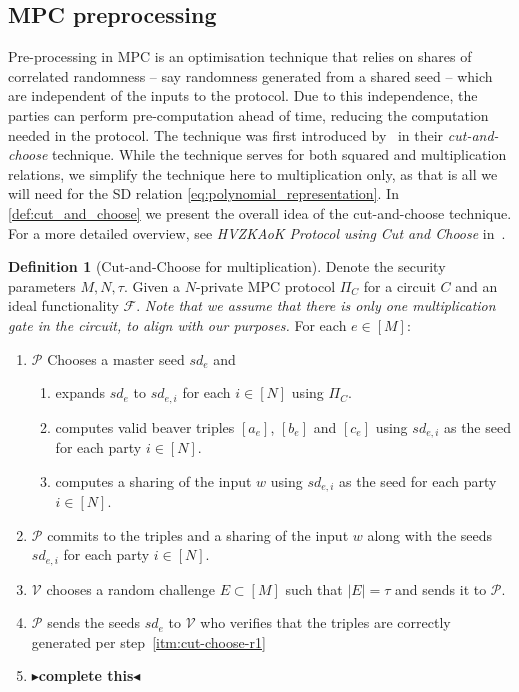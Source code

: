 \documentclass[twoside,11pt]{report}
\theoremstyle{definition}
\newtheorem{definition}{Definition}[section]
\theoremstyle{plain}
\newcommand{\todo}[1]{{\color[rgb]{.5,0,0}\textbf{$\blacktriangleright$#1$\blacktriangleleft$}}}
\begin{document}
\subsection{MPC preprocessing}

Pre-processing in MPC is an optimisation technique that relies on shares of correlated randomness -- say randomness generated from a shared seed -- which are independent of the inputs to the protocol. Due to this independence, the parties can perform pre-computation ahead of time, reducing the computation needed in the protocol. The technique was first introduced by~\cite{katz2018improved} in their \textit{cut-and-choose} technique. While the technique serves for both squared and multiplication relations, we simplify the technique here to multiplication only, as that is all we will need for the SD relation \autoref{eq:polynomial_representation}. In \autoref{def:cut_and_choose} we present the overall idea of the cut-and-choose technique. For a more detailed overview, see \textit{HVZKAoK Protocol using Cut and Choose} in~\cite{baum2020concretely}.

\begin{definition}[Cut-and-Choose for multiplication]\label{def:cut_and_choose}
  Denote the security parameters $M, N, \tau$. Given a $N$-private MPC protocol $\Pi_C$ for a circuit $C$ and an ideal functionality $\mathcal{F}$. \textit{Note that we assume that there is only one multiplication gate in the circuit, to align with our purposes.}
  For each $e \in [M]$:
  \begin{enumerate}[itemsep=0pt, parsep=0pt]
    \item\label{itm:cut-choose-r1} $\mathcal{P}$ Chooses a master seed $sd_e$ and
          \begin{enumerate}[nolistsep]
            \item expands $sd_e$ to $sd_{e,i}$ for each $i \in [N]$ using $\Pi_C$.
            \item computes valid beaver triples $[a_{e}]$, $[b_{e}]$ and $[c_{e}]$ using $sd_{e,i}$ as the seed for each party $i \in [N]$.
            \item computes a sharing of the input $w$ using $sd_{e,i}$ as the seed for each party $i \in [N]$.
          \end{enumerate}
    \item $\mathcal{P}$ commits to the triples and a sharing of the input $w$ along with the seeds $sd_{e,i}$ for each party $i \in [N]$.
    \item $\mathcal{V}$ chooses a random challenge $E \subset [M]$ such that $|E| = \tau$ and sends it to $\mathcal{P}$.
    \item $\mathcal{P}$ sends the seeds $sd_e$ to $\mathcal{V}$ who verifies that the triples are correctly generated per step~\ref{itm:cut-choose-r1}
    \item \todo{complete this}
  \end{enumerate}
\end{definition}
\end{document}
